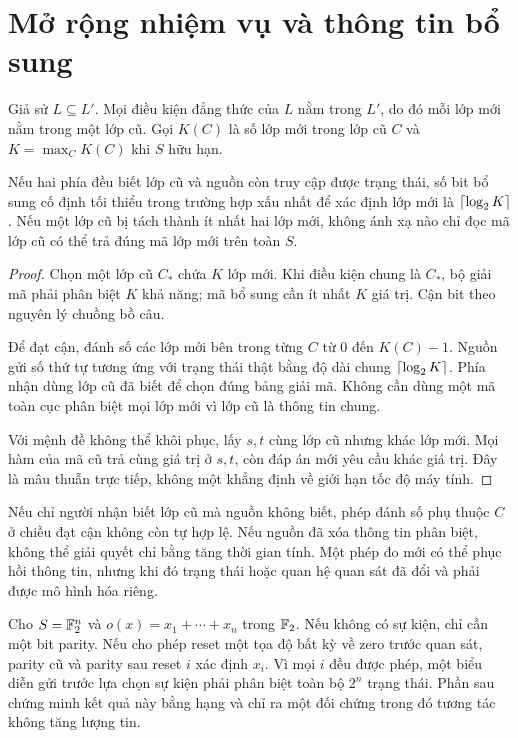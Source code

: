 \section{Mở rộng nhiệm vụ và thông tin bổ sung}\label{sec:refresh}
Giả sử $L\subseteq L'$. Mọi điều kiện đẳng thức của $L$ nằm trong $L'$, do đó mỗi lớp mới nằm trong một lớp cũ. Gọi $K(C)$ là số lớp mới trong lớp cũ $C$ và $K=\max_CK(C)$ khi $S$ hữu hạn.

\begin{theorem}\label{thm:refresh}
Nếu hai phía đều biết lớp cũ và nguồn còn truy cập được trạng thái, số bit bổ sung cố định tối thiểu trong trường hợp xấu nhất để xác định lớp mới là $\left\lceil \log_2 K\right\rceil$. Nếu một lớp cũ bị tách thành ít nhất hai lớp mới, không ánh xạ nào chỉ đọc mã lớp cũ có thể trả đúng mã lớp mới trên toàn $S$.
\end{theorem}
\begin{proof}
Chọn một lớp cũ $C_*$ chứa $K$ lớp mới. Khi điều kiện chung là $C_*$, bộ giải mã phải phân biệt $K$ khả năng; mã bổ sung cần ít nhất $K$ giá trị. Cận bit theo nguyên lý chuồng bồ câu.

Để đạt cận, đánh số các lớp mới bên trong từng $C$ từ $0$ đến $K(C)-1$. Nguồn gửi số thứ tự tương ứng với trạng thái thật bằng độ dài chung $\left\lceil \log_2K\right\rceil$. Phía nhận dùng lớp cũ đã biết để chọn đúng bảng giải mã. Không cần dùng một mã toàn cục phân biệt mọi lớp mới vì lớp cũ là thông tin chung.

Với mệnh đề không thể khôi phục, lấy $s,t$ cùng lớp cũ nhưng khác lớp mới. Mọi hàm của mã cũ trả cùng giá trị ở $s,t$, còn đáp án mới yêu cầu khác giá trị. Đây là mâu thuẫn trực tiếp, không một khẳng định về giới hạn tốc độ máy tính.
\end{proof}
Nếu chỉ người nhận biết lớp cũ mà nguồn không biết, phép đánh số phụ thuộc $C$ ở chiều đạt cận không còn tự hợp lệ. Nếu nguồn đã xóa thông tin phân biệt, không thể giải quyết chỉ bằng tăng thời gian tính. Một phép đo mới có thể phục hồi thông tin, nhưng khi đó trạng thái hoặc quan hệ quan sát đã đổi và phải được mô hình hóa riêng.

\begin{example}
Cho $S=\mathbb F_2^n$ và $o(x)=x_1+\cdots+x_n$ trong $\mathbb F_2$. Nếu không có sự kiện, chỉ cần một bit parity. Nếu cho phép reset một tọa độ bất kỳ về zero trước quan sát, parity cũ và parity sau reset $i$ xác định $x_i$. Vì mọi $i$ đều được phép, một biểu diễn gửi trước lựa chọn sự kiện phải phân biệt toàn bộ $2^n$ trạng thái. Phần sau chứng minh kết quả này bằng hạng và chỉ ra một đối chứng trong đó tương tác không tăng lượng tin.
\end{example}
